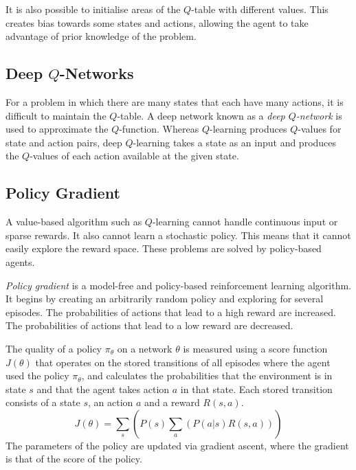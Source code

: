 It is also possible to initialise areas of the \( Q \)-table with different values.
This creates bias towards some states and actions, allowing the agent to take advantage of prior knowledge of the problem.

\subsection{Deep \texorpdfstring{\( Q \)}{Q}-Networks}

For a problem in which there are many states that each have many actions, it is difficult to maintain the \( Q \)-table.
A deep network known as a \emph{deep \( Q \)-network} is used to approximate the \( Q \)-function.
Whereas \( Q \)-learning produces \( Q \)-values for state and action pairs, deep \( Q \)-learning takes a state as an input and produces the \( Q \)-values of each action available at the given state.

\subsection{Policy Gradient}

A value-based algorithm such as \( Q \)-learning cannot handle continuous input or sparse rewards.
It also cannot learn a stochastic policy.
This means that it cannot easily explore the reward space.
These problems are solved by policy-based agents.

\emph{Policy gradient} is a model-free and policy-based reinforcement learning algorithm.
It begins by creating an arbitrarily random policy and exploring for several episodes.
The probabilities of actions that lead to a high reward are increased.
The probabilities of actions that lead to a low reward are decreased.

The quality of a policy \( \pi_{\theta} \) on a network \( \theta \) is measured using a score function \( J\!\left( \theta \right) \) that operates on the stored transitions of all episodes where the agent used the policy \( \pi_{\theta} \), and calculates the probabilities that the environment is in state \( s \) and that the agent takes action \( a \) in that state.
Each stored transition consists of a state \( s \), an action \( a \) and a reward \( R\!\left( s, a \right) \).
\begin{equation*}
  J\!\left( \theta \right) = \sum_{s} \left( P\!\left( s \right) \sum_{a} \left( P\!\left( a \vert s \right) R\!\left( s, a \right) \right) \right)
\end{equation*}
The parameters of the policy are updated via gradient ascent, where the gradient is that of the score of the policy.


